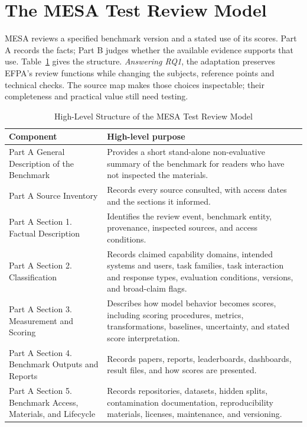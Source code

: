 \documentclass[conference]{IEEEtran}
\begin{document}
\section{The MESA Test Review Model}
    
    MESA reviews a specified benchmark version and a stated use of its scores. Part A records the facts; Part B judges whether the available evidence supports that use. Table~\ref{tab:mesa-review-structure} gives the structure. \emph{Answering RQ1}, the adaptation preserves EFPA's review functions while changing the subjects, reference points and technical checks. The source map makes those choices inspectable; their completeness and practical value still need testing.
    
    \begin{table}[t]
    \caption{High-Level Structure of the MESA Test Review Model}
    \label{tab:mesa-review-structure}
    \centering
    \scriptsize
    \begin{tabularx}{\textwidth}{@{}>{\raggedright\arraybackslash}p{}>{\raggedright\arraybackslash}X@{}}
    \toprule
    Component & High-level purpose \\
    \midrule
    Part A General Description of the Benchmark & Provides a short stand-alone non-evaluative summary of the benchmark for readers who have not inspected the materials. \\ \hline
    Part A Source Inventory & Records every source consulted, with access dates and the sections it informed. \\ \hline
    Part A Section 1. Factual Description & Identifies the review event, benchmark entity, provenance, inspected sources, and access conditions. \\ \hline
    Part A Section 2. Classification & Records claimed capability domains, intended systems and users, task families, task interaction and response types, evaluation conditions, versions, and broad-claim flags. \\ \hline
    Part A Section 3. Measurement and Scoring & Describes how model behavior becomes scores, including scoring procedures, metrics, transformations, baselines, uncertainty, and stated score interpretation. \\ \hline
    Part A Section 4. Benchmark Outputs and Reports & Records papers, reports, leaderboards, dashboards, result files, and how scores are presented. \\ \hline
    Part A Section 5. Benchmark Access, Materials, and Lifecycle & Records repositories, datasets, hidden splits, contamination documentation, reproducibility materials, licenses, maintenance, and versioning. \\ \hline

\end{tabularx}
\end{table}
\end{document}
